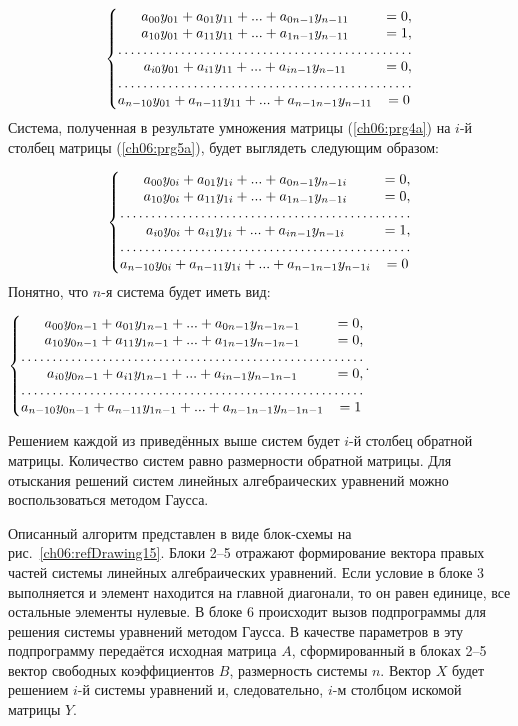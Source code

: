 \begin{equation*}
\left\{\begin{matrix}
a_{00}y_{01}+a_{01}y_{11}+...+a_{0n-1}y_{n-11}&=0,\\
a_{10}y_{01}+a_{11}y_{11}+...+a_{1n-1}y_{n-11}&=1,\\
\hdotsfor{2}\\
a_{i0}y_{01}+a_{i1}y_{11}+...+a_{in-1}y_{n-11}&=0,\\
\hdotsfor{2}\\
a_{n-10}y_{01}+a_{n-11}y_{11}+...+a_{n-1n-1}y_{n-11}&=0
\end{matrix}\right.
\end{equation*}
Система, полученная в результате умножения матрицы (\ref{ch06:prg4a}) на $i$-й столбец матрицы
(\ref{ch06:prg5a}), будет выглядеть следующим образом:

\begin{equation*}
\left\{\begin{matrix}
a_{00}y_{0i}+a_{01}y_{1i}+...+a_{0n-1}y_{n-1i}&=0,\\
a_{10}y_{0i}+a_{11}y_{1i}+...+a_{1n-1}y_{n-1i}&=0,\\
\hdotsfor{2}\\
a_{i0}y_{0i}+a_{i1}y_{1i}+...+a_{in-1}y_{n-1i}&=1,\\
\hdotsfor{2}\\
a_{n-10}y_{0i}+a_{n-11}y_{1i}+...+a_{n-1n-1}y_{n-1i}&=0
\end{matrix}\right.
\end{equation*}
Понятно, что $n$-я система будет иметь вид:

$\left\{\begin{matrix}
a_{00}y_{0n-1}+a_{01}y_{1n-1}+...+a_{0n-1}y_{n-1n-1}&=0,\\
a_{10}y_{0n-1}+a_{11}y_{1n-1}+...+a_{1n-1}y_{n-1n-1}&=0,\\
\hdotsfor{2}\\
a_{i0}y_{0n-1}+a_{i1}y_{1n-1}+...+a_{in-1}y_{n-1n-1}&=0,\\
\hdotsfor{2}\\
a_{n-10}y_{0n-1}+a_{n-11}y_{1n-1}+...+a_{n-1n-1}y_{n-1n-1}&=1
\end{matrix}\right.$.

Решением каждой из приведённых выше систем будет $i$-й столбец обратной матрицы. Количество систем равно
размерности обратной матрицы. Для отыскания решений систем линейных алгебраических уравнений можно воспользоваться
методом Гаусса. 

Описанный алгоритм представлен в виде блок-схемы на рис.~\ref{ch06:refDrawing15}. Блоки 2–5 отражают формирование
вектора правых частей системы линейных алгебраических уравнений. 
Если условие в блоке 3 выполняется и элемент находится на главной диагонали, то он равен единице, все
остальные элементы нулевые. В блоке 6 происходит вызов подпрограммы для решения системы уравнений методом Гаусса. В
качестве параметров в эту подпрограмму передаётся исходная матрица $A$, сформированный в блоках 2–5 вектор свободных
коэффициентов $B$, размерность системы $n$. Вектор $X$ будет решением $i$-й системы уравнений и, следовательно, $i$-м
столбцом искомой матрицы $Y$.

